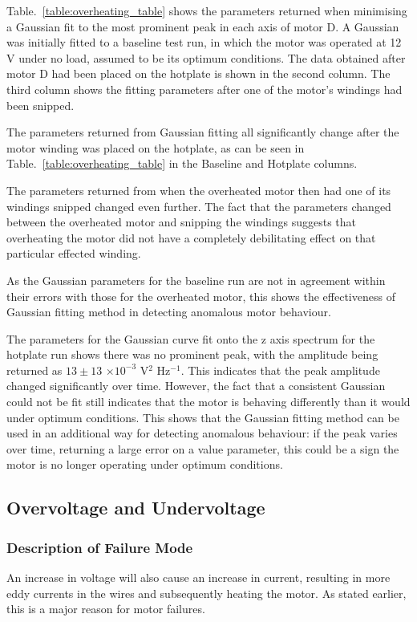 Table.~\ref{table:overheating_table} shows the parameters returned when minimising a Gaussian fit to the most prominent peak in each axis of motor D. A Gaussian was initially fitted to a baseline test run, in which the motor was operated at 12 V under no load, assumed to be its optimum conditions. The data obtained after motor D had been placed on the hotplate is shown in the second column. The third column shows the fitting parameters after one of the motor's windings had been snipped. 

The parameters returned from Gaussian fitting all significantly change after the motor winding was placed on the hotplate, as can be seen in Table.~\ref{table:overheating_table} in the Baseline and Hotplate columns.

The parameters returned from when the overheated motor then had one of its windings snipped changed even further. The fact that the parameters changed between the overheated motor and snipping the windings suggests that overheating the motor did not have a completely debilitating effect on that particular effected winding.

As the Gaussian parameters for the baseline run are not in agreement within their errors with those for the overheated motor, this shows the effectiveness of Gaussian fitting method in detecting anomalous motor behaviour. 

The parameters for the Gaussian curve fit onto the z axis spectrum for the hotplate run shows there was no prominent peak, with the amplitude being returned as $13 \pm 13$ $\times 10^{-3}$ V$^2$ Hz$^{-1}$. This indicates that the peak amplitude changed significantly over time. However, the fact that a consistent Gaussian could not be fit still indicates that the motor is behaving differently than it would under optimum conditions. This shows that the Gaussian fitting method can be used in an additional way for detecting anomalous behaviour: if the peak varies over time, returning a large error on a value parameter, this could be a sign the motor is no longer operating under optimum conditions.

\subsection{Overvoltage and Undervoltage}

\subsubsection{Description of Failure Mode}
An increase in voltage will also cause an increase in current, resulting in more eddy currents in the wires and subsequently heating the motor. As stated earlier, this is a major reason for motor failures. 

